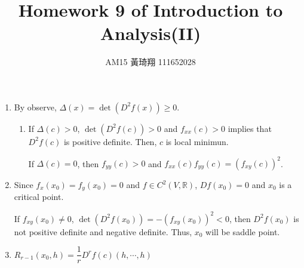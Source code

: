 \documentclass[12pt]{article}
\title{Homework 9 of Introduction to Analysis(II)}
\author{AM15 黃琦翔 111652028}
\begin{document}
\maketitle
\begin{enumerate}
    \item By observe, $\Delta(x) = \det(D^2f(x))\geq 0$.
    \begin{enumerate}
        \item If $\Delta(c) > 0$, $\det(D^2f(c)) > 0$ and $f_{xx}(c) > 0$ implies that $D^2f(c)$ is positive definite.
        Then, $c$ is local minimun.

        If $\Delta(c) = 0$, then $f_{yy}(c) > 0$ and $f_{xx}(c)f_{yy}(c) = (f_{xy}(c))^2$.
        

    \end{enumerate}

    \item Since $f_x(x_0) = f_y(x_0) = 0$ and $f \in C^2(V, \mathbb{R})$, $Df(x_0) = 0$ and $x_0$ is a critical point.
    
    If $f_{xy}(x_0)\neq 0$, $\det(D^2f(x_0)) = - (f_{xy}(x_0))^2 < 0$, then $D^2f(x_0)$ is not positive definite and negative definite.
    Thus, $x_0$ will be saddle point.

    \item $R_{r-1}(x_0, h) = \dfrac{1}{r}D^rf(c)(h, \cdots, h)$
\end{enumerate}
\end{document}
